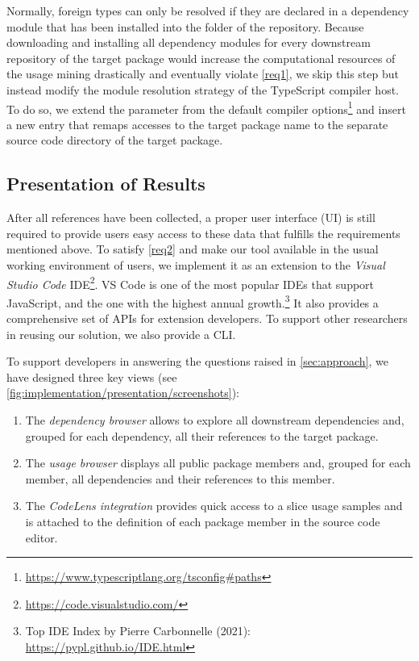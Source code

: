 Normally, foreign types can only be resolved if they are declared in a dependency module that has been installed into the  folder of the repository.
Because downloading and installing all dependency modules for every downstream repository of the target package would increase the computational resources of the usage mining drastically and eventually violate \cref{req1}, we skip this step but instead modify the module resolution strategy of the TypeScript compiler host.
To do so, we extend the  parameter from the default compiler options\footnote{\url{https://www.typescriptlang.org/tsconfig\#paths}} and insert a new entry that remaps accesses to the target package name to the separate source code directory of the target package.

\subsection{Presentation of Results}
\label{sec:implementation/presentation}

After all references have been collected, a proper user interface (UI) is still required to provide users easy access to these data that fulfills the requirements mentioned above.
To satisfy \cref{req2} and make our tool available in the usual working environment of users, we implement it as an extension to the \emph{Visual Studio Code} IDE\footnote{\url{https://code.visualstudio.com/}}.
VS Code is one of the most popular IDEs that support JavaScript, and the one with the highest annual growth.\footnote{Top IDE Index by Pierre Carbonnelle (2021): \url{https://pypl.github.io/IDE.html}}
It also provides a comprehensive set of APIs for extension developers.
To support other researchers in reusing our solution, we also provide a CLI.

To support developers in answering the questions raised in \cref{sec:approach}, we have designed three key views (see \cref{fig:implementation/presentation/screenshots}):

\begin{enumerate}[label=(\roman*)]
	\item The \emph{dependency browser} allows to explore all downstream dependencies and, grouped for each dependency, all their references to the target package.
	\item The \emph{usage browser} displays all public package members and, grouped for each member, all dependencies and their references to this member.
	\item The \emph{CodeLens integration} provides quick access to a slice usage samples and is attached to the definition of each package member in the source code editor.
\end{enumerate}

